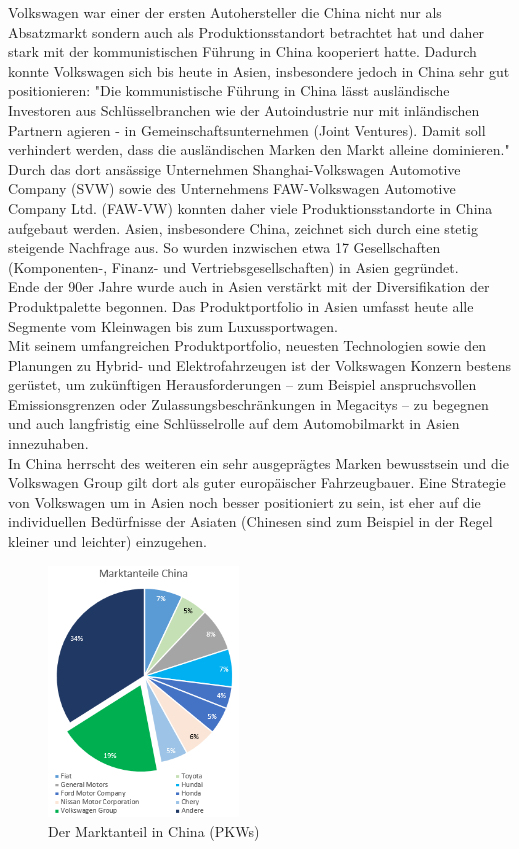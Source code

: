 \documentclass[12pt]{article}
\begin{document}
Volkswagen war einer der ersten Autohersteller die China nicht nur als Absatzmarkt sondern auch als Produktionsstandort betrachtet hat und daher stark mit der kommunistischen Führung in China kooperiert hatte. Dadurch konnte Volkswagen sich bis heute in Asien, insbesondere jedoch in China sehr gut positionieren: 
"Die kommunistische Führung in China lässt ausländische Investoren aus Schlüsselbranchen wie der Autoindustrie nur mit inländischen Partnern agieren - in Gemeinschaftsunternehmen (Joint Ventures). Damit soll verhindert werden, dass die ausländischen Marken den Markt alleine dominieren." \cite{vwamstrategiechina2}\\
Durch das dort ansässige Unternehmen Shanghai-Volkswagen Automotive Company (SVW) sowie des Unternehmens FAW-Volkswagen Automotive Company Ltd. (FAW-VW) konnten daher viele Produktionsstandorte in China aufgebaut werden.
Asien, insbesondere China, zeichnet sich durch eine stetig steigende Nachfrage aus. So wurden inzwischen etwa 17 Gesellschaften (Komponenten-, Finanz- und Vertriebsgesellschaften) in Asien gegründet. \\
Ende der 90er Jahre wurde auch in Asien verstärkt mit der Diversifikation der Produktpalette begonnen. Das  Produktportfolio in Asien umfasst heute alle Segmente vom Kleinwagen bis zum Luxussportwagen.
\\
Mit seinem umfangreichen Produktportfolio, neuesten Technologien sowie den Planungen zu Hybrid- und Elektrofahrzeugen ist der Volkswagen Konzern bestens gerüstet, um zukünftigen Herausforderungen – zum Beispiel anspruchsvollen Emissionsgrenzen oder Zulassungsbeschränkungen in Megacitys – zu begegnen und auch langfristig eine Schlüsselrolle auf dem Automobilmarkt in Asien innezuhaben. \\
In China herrscht des weiteren ein sehr ausgeprägtes Marken bewusstsein und die Volkswagen Group gilt dort als guter europäischer Fahrzeugbauer.  Eine Strategie von Volkswagen um in Asien noch besser positioniert zu sein, ist eher auf die individuellen Bedürfnisse der Asiaten (Chinesen sind zum Beispiel in der Regel kleiner und leichter) einzugehen. \cite{vwamstrategiechina}
\begin{figure}[here!]
\centering
\includegraphics[width=0.45\textwidth]{images/mach}
\caption{Der Marktanteil in China (PKWs)}
\label{fig:marktchina}
\end{figure}\FloatBarrier
\end{document}

